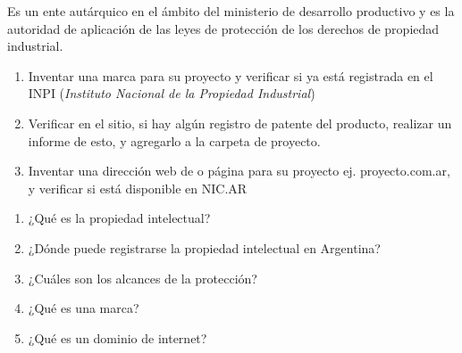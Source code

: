 \documentclass[../main]{subfiles}
\begin{document}
Es un ente autárquico en el ámbito del ministerio de desarrollo
productivo y es la autoridad de aplicación de las leyes de protección
de los derechos de propiedad industrial.

\begin{enumerate}
  \item  Inventar una marca para su proyecto y verificar si ya está
    registrada en el INPI (\emph{Instituto Nacional de la Propiedad Industrial})


  \item Verificar en el sitio, si hay algún registro de patente del
    producto, realizar un informe de esto, y agregarlo a la carpeta de proyecto.

  \item Inventar una dirección web de o página para su proyecto ej.
    proyecto.com.ar, y verificar si está disponible en NIC.AR
\end{enumerate}

\begin{enumerate}
  \item ¿Qué es la propiedad intelectual?
  \item ¿Dónde puede registrarse la propiedad intelectual en Argentina?
  \item ¿Cuáles son los alcances de la protección?
  \item ¿Qué es una marca?
  \item ¿Qué es un dominio de internet?
\end{enumerate}
\end{document}

